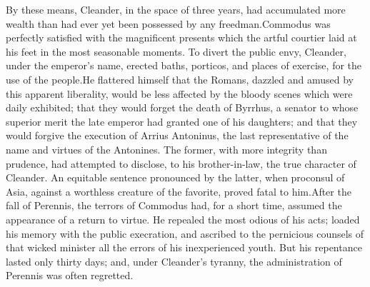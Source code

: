 By these means, Cleander, in the space of three years, had
accumulated more wealth than had ever yet been possessed by any
freedman.\footnotemark[22] Commodus was perfectly satisfied with the
magnificent presents which the artful courtier laid at his feet
in the most seasonable moments. To divert the public envy,
Cleander, under the emperor’s name, erected baths, porticos, and
places of exercise, for the use of the people.\footnotemark[23] He flattered
himself that the Romans, dazzled and amused by this apparent
liberality, would be less affected by the bloody scenes which
were daily exhibited; that they would forget the death of
Byrrhus, a senator to whose superior merit the late emperor had
granted one of his daughters; and that they would forgive the
execution of Arrius Antoninus, the last representative of the
name and virtues of the Antonines. The former, with more
integrity than prudence, had attempted to disclose, to his
brother-in-law, the true character of Cleander. An equitable
sentence pronounced by the latter, when proconsul of Asia,
against a worthless creature of the favorite, proved fatal to
him.\footnotemark[24] After the fall of Perennis, the terrors of Commodus had,
for a short time, assumed the appearance of a return to virtue.
He repealed the most odious of his acts; loaded his memory with
the public execration, and ascribed to the pernicious counsels of
that wicked minister all the errors of his inexperienced youth.
But his repentance lasted only thirty days; and, under Cleander’s
tyranny, the administration of Perennis was often regretted.




